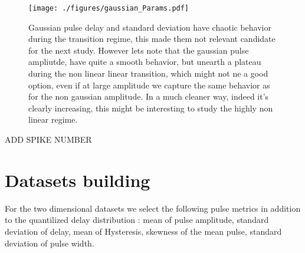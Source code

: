 \documentclass[11pt,a4paper,openany]{report}
\begin{document}
\begin{multicols}{2}
    \begin{figure}[H]
        \centering
        \texttt{[image: ./figures/gaussian\_Params.pdf]}
        \caption{Gaussian pulse delay and standard deviation have chaotic behavior during the transition regime, this made them not relevant candidate for the next study. However lets note that the gaussian pulse ampliutde,
            have quite a smooth behavior, but unearth a plateau during the non linear linear transition, which might not ne a good option, even if at large amplitude we capture the same behavior as for the non gaussian amplitude.
            In a much cleaner way, indeed it's clearly increasing, this might be interesting to study the highly non linear regime.}
        \label{}
    \end{figure}


    ADD SPIKE NUMBER

    \section{Datasets building}
    For the two dimensional datasets we select the following pulse metrics in addition to the quantilized delay distribution :  mean of pulse amplitude, standard deviation of delay, mean of Hysteresis, skewness of the mean pulse, standard deviation of pulse width.


\end{multicols}
\end{document}
